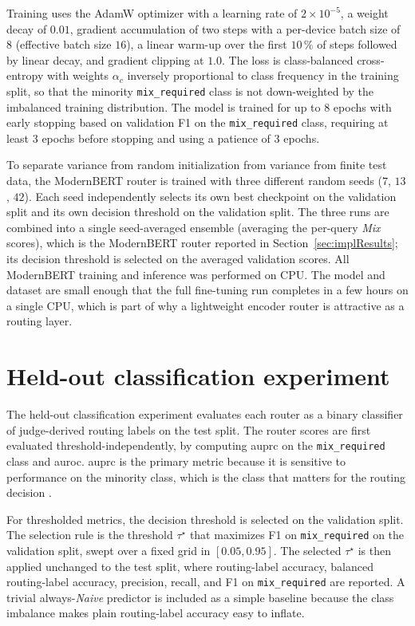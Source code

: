 \documentclass[english, bibtex]{kththesis}               %
\numberwithin{listing}{chapter}
\begin{document}
Training uses the AdamW optimizer \cite{loshchilov2019decoupled} with a learning rate of $2 \times 10^{-5}$, a weight decay of $0.01$, gradient accumulation of two steps with a per-device batch size of $8$ (effective batch size $16$), a linear warm-up over the first $10\,\%$ of steps followed by linear decay, and gradient clipping at $1.0$. The loss is class-balanced cross-entropy with weights $\alpha_c$ inversely proportional to class frequency in the training split, so that the minority \texttt{mix\_required} class is not down-weighted by the imbalanced training distribution. The model is trained for up to $8$ epochs with early stopping based on validation F1 on the \texttt{mix\_required} class, requiring at least $3$ epochs before stopping and using a patience of $3$ epochs.

To separate variance from random initialization from variance from finite test data, the ModernBERT router is trained with three different random seeds ($7$, $13$, $42$). Each seed independently selects its own best checkpoint on the validation split and its own decision threshold on the validation split. The three runs are combined into a single seed-averaged ensemble (averaging the per-query \emph{Mix} scores), which is the ModernBERT router reported in Section~\ref{sec:implResults}; its decision threshold is selected on the averaged validation scores. All ModernBERT training and inference was performed on CPU. The model and dataset are small enough that the full fine-tuning run completes in a few hours on a single CPU, which is part of why a lightweight encoder router is attractive as a routing layer.

\section{Held-out classification experiment}
\label{sec:implClassification}

The held-out classification experiment evaluates each router as a binary classifier of judge-derived routing labels on the test split. The router scores are first evaluated threshold-independently, by computing \gls{auprc} on the \texttt{mix\_required} class and \gls{auroc}. \Gls{auprc} is the primary metric because it is sensitive to performance on the minority class, which is the class that matters for the routing decision \cite{saito2015precision}.

For thresholded metrics, the decision threshold is selected on the validation split. The selection rule is the threshold $\tau^\star$ that maximizes F1 on \texttt{mix\_required} on the validation split, swept over a fixed grid in $[0.05, 0.95]$. The selected $\tau^\star$ is then applied unchanged to the test split, where routing-label accuracy, balanced routing-label accuracy, precision, recall, and F1 on \texttt{mix\_required} are reported. A trivial always-\emph{Naive} predictor is included as a simple baseline because the class imbalance makes plain routing-label accuracy easy to inflate.
\end{document}
